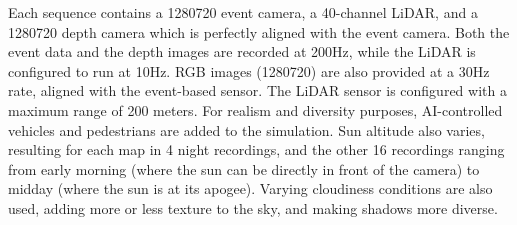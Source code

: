 \begin{table}[ht]
  \centering
  \setlength\tabcolsep{6pt}
  \caption{Detailed content of our \acrshort{sled} dataset containing 160 sequences of 10 seconds each.}\label{tab:aled:sled_content}
\end{table}

Each sequence contains a 1280\texttimes{}720 event camera, a 40-channel LiDAR, and a 1280\texttimes{}720 depth camera which is perfectly aligned with the event camera. Both the event data and the depth images are recorded at 200Hz, while the LiDAR is configured to run at 10Hz. RGB images (1280\texttimes{}720) are also provided at a 30Hz rate, aligned with the event-based sensor. The LiDAR sensor is configured with a maximum range of 200 meters. For realism and diversity purposes, AI-controlled vehicles and pedestrians are added to the simulation. Sun altitude also varies, resulting for each map in 4 night recordings, and the other 16 recordings ranging from early morning (where the sun can be directly in front of the camera) to midday (where the sun is at its apogee). Varying cloudiness conditions are also used, adding more or less texture to the sky, and making shadows more diverse.

